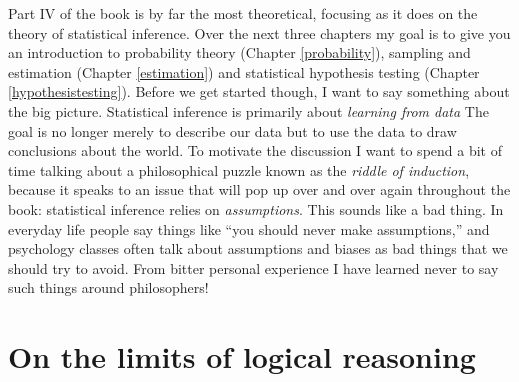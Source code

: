 \documentclass[
]{book}
\begin{document}
Part IV of the book is by far the most theoretical, focusing as it does on the theory of statistical inference. Over the next three chapters my goal is to give you an introduction to probability theory (Chapter \ref{probability}), sampling and estimation (Chapter \ref{estimation}) and statistical hypothesis testing (Chapter \ref{hypothesistesting}). Before we get started though, I want to say something about the big picture. Statistical inference is primarily about \emph{learning from data} The goal is no longer merely to describe our data but to use the data to draw conclusions about the world. To motivate the discussion I want to spend a bit of time talking about a philosophical puzzle known as the \emph{riddle of induction}, because it speaks to an issue that will pop up over and over again throughout the book: statistical inference relies on \emph{assumptions}. This sounds like a bad thing. In everyday life people say things like ``you should never make assumptions,'' and psychology classes often talk about assumptions and biases as bad things that we should try to avoid. From bitter personal experience I have learned never to say such things around philosophers!

\hypertarget{on-the-limits-of-logical-reasoning}{%
\section*{On the limits of logical reasoning}\label{on-the-limits-of-logical-reasoning}}
\end{document}
